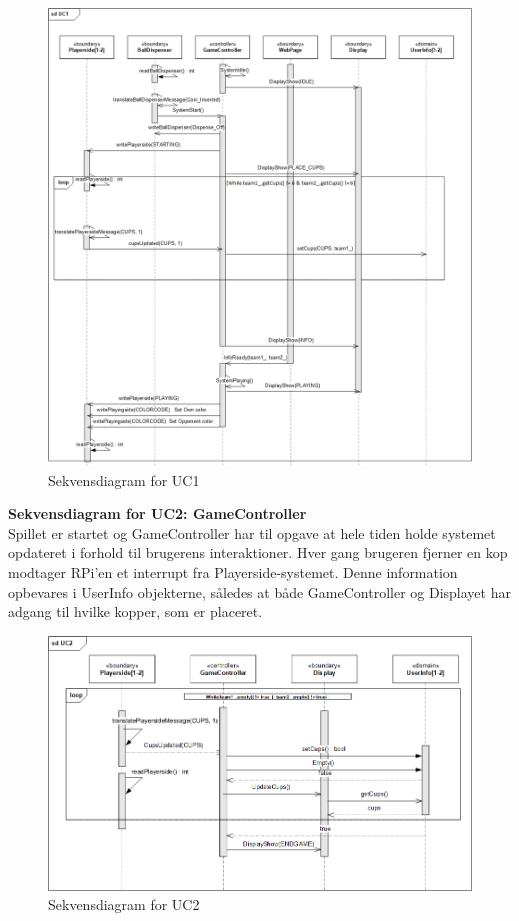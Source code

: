 \documentclass[Arkitektur/System_main.tex]{subfiles}
\begin{document}
\begin{figure}[H]
    \centering
    \includegraphics[width=\textwidth]{Arkitektur/Softwarearkitektur/Applikationsmodel/RPi/graphics_RPi/UC1_SD.png}
    \caption{Sekvensdiagram for UC1}
    \label{fig:UC1_SD_RPi}
\end{figure}

\textbf{Sekvensdiagram for UC2: GameController}\\
Spillet er startet og GameController har til opgave at hele tiden holde systemet opdateret i forhold til brugerens interaktioner. Hver gang brugeren fjerner en kop modtager RPi'en et interrupt fra Playerside-systemet. Denne information opbevares i UserInfo objekterne, således at både GameController og Displayet har adgang til hvilke kopper, som er placeret. 
\begin{figure}[H]
    \centering
    \includegraphics[width=\textwidth]{Arkitektur/Softwarearkitektur/Applikationsmodel/RPi/graphics_RPi/UC2_SD.png}
    \caption{Sekvensdiagram for UC2}
    \label{fig:UC2_SD_RPi}
\end{figure}
\end{document}

